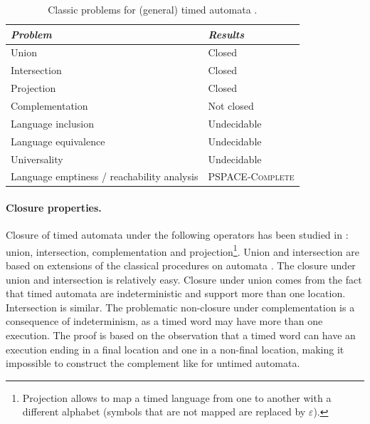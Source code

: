 \begin{table}[htbp]
\centering
\begin{tabular}{|p{7cm}|p{5cm}|}

    \hline

    \textit{Problem} &
    \textit{Results} \\

    \hline \hline

		Union & Closed \\ \hline
		
		Intersection & Closed \\ \hline
		
		Projection & Closed \\ \hline
		
		Complementation & Not closed \\ \hline
		
		Language inclusion & Undecidable \\ \hline
		
		Language equivalence & Undecidable \\ \hline
		
		Universality & Undecidable \\ \hline
		
		Language emptiness / reachability analysis & \textsc{PSPACE-Complete} \\ \hline

\end{tabular}
\caption{Classic problems for (general) timed automata \cite{RADLD94}.}
\label{tab:ta-common-problems}
\end{table}

\paragraph{Closure properties.}
Closure of timed automata under the following operators has been studied in \cite{RADLD94}: union, intersection, complementation and projection\footnote{Projection allows to map a timed language from one to another with a different alphabet (symbols that are not mapped are replaced by $\varepsilon$).}. Union and intersection are based on extensions of the classical procedures on automata \cite{Hopcroft79}. The closure under union and intersection is relatively easy. Closure under union comes from the fact that timed automata are indeterministic and support more than one location. Intersection is similar. The problematic non-closure under complementation is a consequence of indeterminism, as a timed word may have more than one execution. The proof is based on the observation that a timed word can have an execution ending in a final location and one in a non-final location, making it impossible to construct the complement like for untimed automata.

